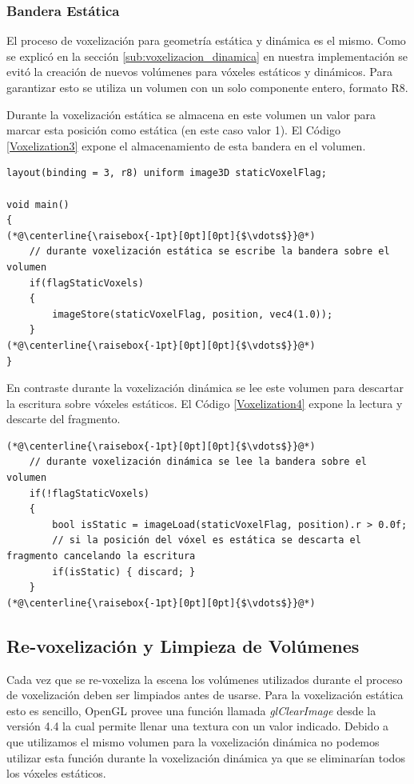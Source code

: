 \subsubsection{Bandera Estática}
El proceso de voxelización para geometría estática y dinámica es el mismo. Como se explicó en la sección \ref{sub:voxelizacion_dinamica} en nuestra implementación se evitó la creación de nuevos volúmenes para vóxeles estáticos y dinámicos. Para garantizar esto se utiliza un volumen con un solo componente entero, formato R8.

Durante la voxelización estática se almacena en este volumen un valor para marcar esta posición como estática (en este caso valor 1). El Código \ref{Voxelization3} expone el almacenamiento de esta bandera en el volumen. 
\\
\begin{lstlisting}[caption={Escritura de la bandera estática durante voxelización de geometría estática}, label=Voxelization3]
layout(binding = 3, r8) uniform image3D staticVoxelFlag;

void main()
{
(*@\centerline{\raisebox{-1pt}[0pt][0pt]{$\vdots$}}@*)
    // durante voxelización estática se escribe la bandera sobre el volumen
    if(flagStaticVoxels)
    {
        imageStore(staticVoxelFlag, position, vec4(1.0));
    }
(*@\centerline{\raisebox{-1pt}[0pt][0pt]{$\vdots$}}@*)
}
\end{lstlisting}

En contraste durante la voxelización dinámica se lee este volumen para descartar la escritura sobre vóxeles estáticos. El Código \ref{Voxelization4} expone la lectura y descarte del fragmento.
\\
\begin{lstlisting}[caption={Lectura de la bandera estática durante voxelización de geometría dinámica.}, label=Voxelization4]
(*@\centerline{\raisebox{-1pt}[0pt][0pt]{$\vdots$}}@*)
    // durante voxelización dinámica se lee la bandera sobre el volumen
    if(!flagStaticVoxels)
    {
        bool isStatic = imageLoad(staticVoxelFlag, position).r > 0.0f;
        // si la posición del vóxel es estática se descarta el fragmento cancelando la escritura
        if(isStatic) { discard; }
    }
(*@\centerline{\raisebox{-1pt}[0pt][0pt]{$\vdots$}}@*)
\end{lstlisting}

\subsection{Re-voxelización y Limpieza de Volúmenes}
Cada vez que se re-voxeliza la escena los volúmenes utilizados durante el proceso de voxelización deben ser limpiados antes de usarse. Para la voxelización estática esto es sencillo, OpenGL provee una función llamada \emph{glClearImage} desde la versión 4.4 la cual permite llenar una textura con un valor indicado. Debido a que utilizamos el mismo volumen para la voxelización dinámica no podemos utilizar esta función durante la voxelización dinámica ya que se eliminarían todos los vóxeles estáticos.

